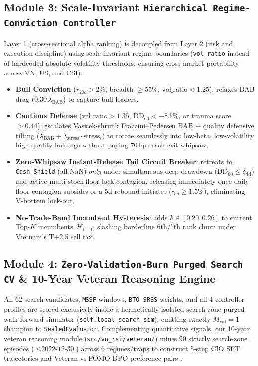 \documentclass[11pt]{article}
\begin{document}
\subsection{Module 3: Scale-Invariant \texttt{Hierarchical Regime-Conviction Controller}}
Layer 1 (cross-sectional alpha ranking) is decoupled from Layer 2 (risk and execution discipline) using scale-invariant regime boundaries (\texttt{vol\_ratio} instead of hardcoded absolute volatility thresholds, ensuring cross-market portability across VN, US, and CSI):
\begin{itemize}[leftmargin=1.4em]
  \item \textbf{Bull Conviction} ($r_{20d} > 2\%$, breadth $\ge 55\%$, $\text{vol\_ratio} < 1.25$): relaxes BAB drag ($0.30\,\lambda_{\text{BAB}}$) to capture bull leaders.
  \item \textbf{Cautious Defense} ($\text{vol\_ratio} > 1.35$, $\text{DD}_{60} < -8.5\%$, or trauma score $> 0.44$): escalates Vasicek-shrunk Frazzini--Pedersen BAB + quality defensive tilting ($\lambda_{\text{BAB}} + \lambda_{\text{stress}} \cdot \text{stress}_t$) to rotate seamlessly into low-beta, low-volatility high-quality holdings without paying 70\,bps cash-exit whipsaw.
  \item \textbf{Zero-Whipsaw Instant-Release Tail Circuit Breaker}: retreats to \texttt{Cash\_Shield} (all-$\text{NaN}$) \emph{only} under simultaneous deep drawdown ($\text{DD}_{60} \le \delta_{\text{dd}}$) and active multi-stock floor-lock contagion, releasing immediately once daily floor contagion subsides or a 5d rebound initiates ($r_{5d} \ge 1.5\%$), eliminating V-bottom lock-out.
  \item \textbf{No-Trade-Band Incumbent Hysteresis}: adds $h \in [0.20, 0.26]$ to current Top-$K$ incumbents $\mathcal{H}_{t-1}$, slashing borderline 6th/7th rank churn under Vietnam's T+2.5 sell tax.
\end{itemize}

\subsection{Module 4: \texttt{Zero-Validation-Burn Purged Search CV} \& 10-Year Veteran Reasoning Engine}
All 62 search candidates, \texttt{MSSF} windows, \texttt{BTO-SRSS} weights, and all 4 controller profiles are scored exclusively inside a hermetically isolated search-zone purged walk-forward simulator (\texttt{self.local\_search\_sim}), emitting exactly $M_{\text{val}} = 1$ champion to \texttt{SealedEvaluator}. Complementing quantitative signals, our 10-year veteran reasoning module (\texttt{src/vn\_rsi/veteran/}) mines 90 strictly search-zone episodes ($\le \text{2022-12-30}$) across 6 regimes/traps to construct 5-step CIO SFT trajectories and Veteran-vs-FOMO DPO preference pairs \citep{rafailov2023dpo}.
\end{document}
